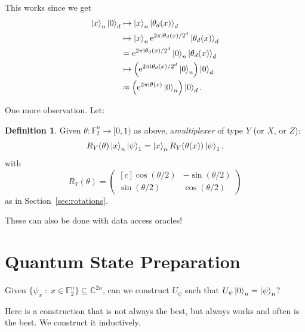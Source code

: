 \documentclass[12pt]{amsart}
\theoremstyle{plain}
\theoremstyle{definition}
\newtheorem{definition}[theorem]{Definition}
\theoremstyle{remark}
\newcommand{\F}{\mathbb{F}}
\newcommand{\C}{\mathbb{C}}
\newcommand{\me}{\mathrm{e}}
\newcommand{\mi}{\mathrm{i}}
\newcommand{\st}{\;{:}\;}
\begin{document}
This works since we get
\begin{align*}
  \ket{x}_n \ket{0}_d
  &\mapsto \ket{x}_n \ket{\theta_d(x)}_d \\
  &\mapsto \ket{x}_n \me^{2\pi \mi \theta_d(x)/2^{d}} \ket{\theta_d(x)}_d \\
  &= \me^{2\pi \mi \theta_d(x)/2^{d}} \ket{0}_n \ket{\theta_d(x)}_d \\
  &\mapsto \left(\me^{2\pi \mi \theta_d(x)/2^{d}} \ket{0}_n\right) \ket{0}_d \\
  &\approx \left(\me^{2\pi \mi \theta(x)} \ket{0}_n\right) \ket{0}_d.
\end{align*}


One more observation.  Let:

\begin{definition}
  Given $\theta : \F_2^n \to [0, 1)$ as above, a\emph{multiplexer} of type $Y$ (or $X$, or $Z$):
  \[
    R_Y(\theta) \ket{x}_n \ket{\psi}_1 = \ket{x}_n R_Y(\theta(x)) \ket{\psi}_1,
  \]
  with
  \[
    R_Y(\theta) = \begin{pmatrix*}[c]
      \cos(\theta/2) & -\sin(\theta/2) \\
      \sin(\theta/2) & \cos(\theta/2)
    \end{pmatrix*}
  \]
  as in Section~\ref{sec:rotations}.
\end{definition}

These can also be done with data access oracles!



\section{Quantum State Preparation}


Given $\{ \psi_x \st x \in \F_2^n \} \subseteq \C^{2n}$, can we construct $U_\psi$ such that $U_\psi \ket{0}_n = \ket{\psi}_n$?

Here is a construction that is not always the best, but always works and often is the best.  We construct it inductively.
\end{document}
